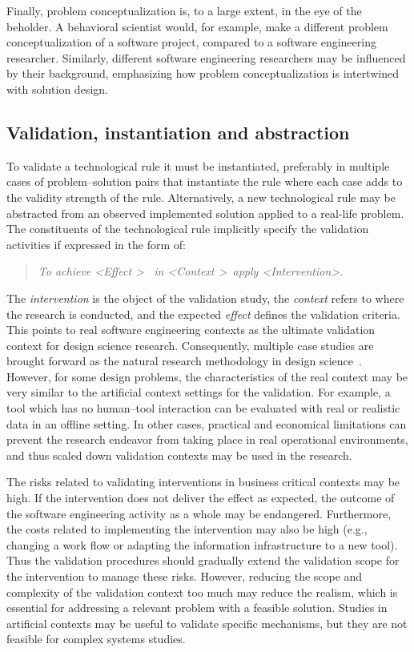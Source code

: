 \documentclass[graybox]{svmult}
\begin{document}
Finally, problem conceptualization is, to a large extent, in the eye of the beholder. A behavioral scientist would, for example, make a different problem conceptualization of a software project, compared to a software engineering researcher. Similarly, different software engineering researchers may be influenced by their background, emphasizing how problem conceptualization is intertwined with solution design.

 

\subsection{Validation, instantiation and abstraction}

To validate a technological rule it must be instantiated, preferably in multiple cases of problem--solution pairs that instantiate the rule where each case adds to the validity strength of the rule. Alternatively, a new technological rule may be abstracted from an observed implemented solution applied to a real-life problem.
The constituents of the technological rule implicitly specify the validation activities if expressed in the form of:

\begin{quote}{\emph{To achieve \textless Effect \textgreater ~ in \textless Context \textgreater~apply \textless Intervention\textgreater}.} 
\end{quote} 
The \emph{intervention} is the object of the validation study, the \emph{context}  refers to where the research is conducted, and the expected \emph{effect} defines the validation criteria. This points to real software engineering contexts as the ultimate validation context for design science research. 
Consequently, multiple case studies are brought forward as the natural research methodology in design science~\cite{van_aken_management_2004}. However, for some design problems, the characteristics of the real context may be very similar to the artificial context settings for the validation. For example, a tool which has no human--tool interaction can be evaluated with real or realistic data in an offline setting. In other cases, practical and economical limitations can prevent the research endeavor from taking place in real operational environments, and thus scaled down validation contexts may be used in the research. 

The risks related to validating interventions in business critical contexts may be high. If the intervention does not deliver the effect as expected, the outcome of the software engineering activity as a whole may be endangered. Furthermore, the costs related to implementing the intervention may also be high (e.g., changing a work flow or adapting the information infrastructure to a new tool). Thus the validation procedures should gradually extend the validation scope for the intervention to manage these risks.
However, reducing the scope and complexity of the validation context too much may reduce the realism, which is essential for addressing a relevant problem with a feasible solution. Studies in artificial contexts may be useful to validate specific mechanisms, but they are not feasible for complex systems studies.  
\end{document}

